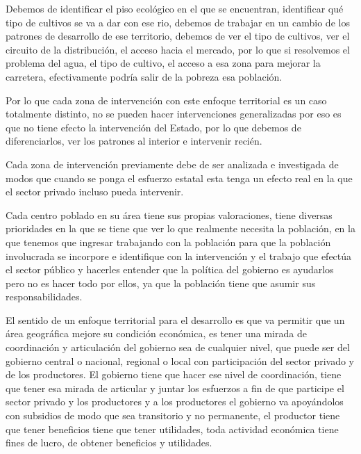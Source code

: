 \documentclass[
  jou,
  floatsintext,
  longtable,
  a4paper,
  nolmodern,
  notxfonts,
  notimes,
  12pt,
  colorlinks=true,linkcolor=blue,citecolor=blue,urlcolor=blue]{apa7}
\begin{document}
Debemos de identificar el piso ecológico en el que se encuentran,
identificar qué tipo de cultivos se va a dar con ese rio, debemos de
trabajar en un cambio de los patrones de desarrollo de ese territorio,
debemos de ver el tipo de cultivos, ver el circuito de la distribución,
el acceso hacia el mercado, por lo que si resolvemos el problema del
agua, el tipo de cultivo, el acceso a esa zona para mejorar la
carretera, efectivamente podría salir de la pobreza esa población.

Por lo que cada zona de intervención con este enfoque territorial es un
caso totalmente distinto, no se pueden hacer intervenciones
generalizadas por eso es que no tiene efecto la intervención del Estado,
por lo que debemos de diferenciarlos, ver los patrones al interior e
intervenir recién.

Cada zona de intervención previamente debe de ser analizada e
investigada de modos que cuando se ponga el esfuerzo estatal esta tenga
un efecto real en la que el sector privado incluso pueda intervenir.

Cada centro poblado en su área tiene sus propias valoraciones, tiene
diversas prioridades en la que se tiene que ver lo que realmente
necesita la población, en la que tenemos que ingresar trabajando con la
población para que la población involucrada se incorpore e identifique
con la intervención y el trabajo que efectúa el sector público y
hacerles entender que la política del gobierno es ayudarlos pero no es
hacer todo por ellos, ya que la población tiene que asumir sus
responsabilidades.

El sentido de un enfoque territorial para el desarrollo es que va
permitir que un área geográfica mejore su condición económica, es tener
una mirada de coordinación y articulación del gobierno sea de cualquier
nivel, que puede ser del gobierno central o nacional, regional o local
con participación del sector privado y de los productores. El gobierno
tiene que hacer ese nivel de coordinación, tiene que tener esa mirada de
articular y juntar los esfuerzos a fin de que participe el sector
privado y los productores y a los productores el gobierno va apoyándolos
con subsidios de modo que sea transitorio y no permanente, el productor
tiene que tener beneficios tiene que tener utilidades, toda actividad
económica tiene fines de lucro, de obtener beneficios y utilidades.
\end{document}

